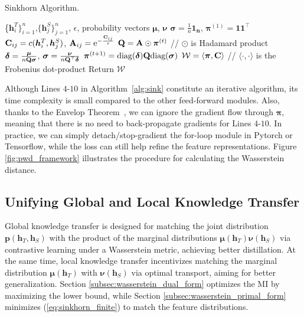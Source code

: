 \documentclass[final]{cvpr}
\newcommand{\Amat}{{\bf A}}
\newcommand{\Cmat}{{\bf C}}
\newcommand{\Qmat}{{\bf Q}}
\newcommand{\hv}{{\boldsymbol h}}
\newcommand{\pv}{{\boldsymbol p}}
\newcommand{\muv}{{\boldsymbol \mu}}
\newcommand{\nuv}{{\boldsymbol \nu}}
\newcommand{\piv}{{\boldsymbol \pi}}
\newcommand{\Wcal}{\mathcal{W}}
\theoremstyle{definition}
\begin{document}
\begin{algorithm}[!t]
\caption{Sinkhorn Algorithm.}
\label{alg:sink}
\begin{algorithmic}[1]
 \footnotesize{ \{$\hv^T_i\}_{i=1}^n$,$\{\hv^S_j\}_{j=1}^n$, $\epsilon$, probability vectors $\muv$, $\nuv$}
\STATE $\boldsymbol{\sigma}=\frac{1}{n}\mathbf{1_n}$, $\boldsymbol{\pi}^{(1)} = \mathbf{1} \mathbf{1}^\top$
\STATE $\Cmat_{ij} = c(\hv^T_i, \hv^S_j)$, $\Amat_{ij} = {\rm e}^{-\frac{\Cmat_{ij}}{\epsilon}}$
    \STATE $\Qmat = \Amat \odot \boldsymbol{\pi}^{(t)}$ \footnotesize{// $\odot$ is Hadamard product}
        \STATE $\boldsymbol{\delta} = \frac{\muv}{n\Qmat{\boldsymbol{\sigma}}}$, $\boldsymbol{\sigma} = \frac{\nuv}{n\Qmat^\top\boldsymbol{\delta}}$
    \ENDFOR
    \STATE $\boldsymbol{\pi}^{(t+1)} = \text{diag}(\boldsymbol{\delta})\Qmat\text{diag}(\boldsymbol{\sigma})$
\ENDFOR
\STATE $\Wcal=\langle \boldsymbol{\pi}, \Cmat \rangle$  // \footnotesize{$\langle \cdot, \cdot \rangle$ is the Frobenius dot-product} 
\STATE Return $\Wcal$


\end{algorithmic}
\end{algorithm} Although Lines $4$-$10$ in Algorithm~\ref{alg:sink} constitute an iterative algorithm, its time complexity is small compared to the other feed-forward modules. Also, thanks to the Envelop Theorem~\cite{carter2001foundations}, we can ignore the gradient flow through $\piv$, meaning that there is no need to back-propagate gradients for Lines $4$-$10$. In practice, we can simply detach/stop-gradient the for-loop module in Pytorch or Tensorflow, while the loss can still help refine the feature representations. 
Figure \ref{fig:pwd_framework} illustrates the procedure for calculating the Wasserstein distance.

\subsection{Unifying Global and Local Knowledge Transfer}

\label{sec:final_algorithm}
Global knowledge transfer is designed for matching the joint distribution $\pv(\hv_T, \hv_S)$ with the product of the marginal distributions $\muv(\hv_T)\nuv(\hv_S)$ via contrastive learning under a Wasserstein metric, achieving better distillation.
At the same time, local knowledge transfer incentivizes matching the marginal distribution $\muv(\hv_T)$ with $\nuv(\hv_S)$ via optimal transport, aiming for better generalization. 
Section \ref{subsec:wasserstein_dual_form} optimizes the MI by maximizing the lower bound, while Section \ref{subsec:wasserstein_primal_form} minimizes (\ref{eq:sinkhorn_finite}) to match the feature distributions.
\end{document}
